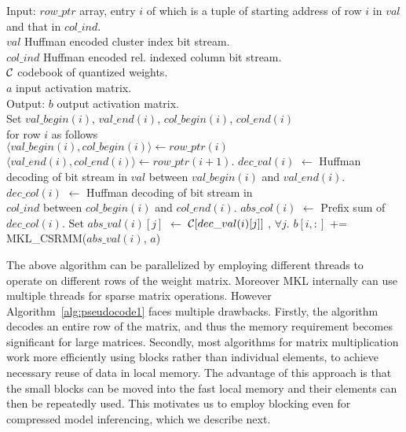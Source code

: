 \begin{algorithm}[t]
\caption{Na{\"i}ve algorithm for inferencing using compressed model }
\label{alg:pseudocode1}
\small
\begin{algorithmic}[1]
	\STATE Input: $row\_ptr$ array, entry $i$ of which is a tuple 
	of  starting address of row $i$ in $val$ and that in $col\_ind$.\\
	$val$ Huffman encoded cluster index bit stream. \\
	$col\_ind$ Huffman encoded rel. indexed column bit stream. \\
	${\cal C}$ codebook of quantized weights. \\
	$a$ input activation matrix. \\
	\STATE Output: $b$ output  activation  matrix. \\
		 
		\STATE Set $val\_begin(i)$,  $val\_end(i)$, $col\_begin(i)$, $col\_end(i)$\\
		 for row $i$ as follows \\
		 \quad  \quad $\langle val\_begin(i), col\_begin(i) \rangle \leftarrow row\_ptr(i)$\\
		 \quad  \quad $\langle val\_end(i), col\_end(i) \rangle \leftarrow row\_ptr(i+1)$.
		 \STATE $dec\_val(i)$ $\leftarrow$ Huffman decoding of bit stream in $val$ between $val\_begin(i)$ and  $val\_end(i)$.
		\STATE  $dec\_col(i)$ $\leftarrow$ Huffman decoding of bit stream in \\
		$col\_ind$ between $col\_begin(i)$ and  $col\_end(i)$.
		\STATE $abs\_col(i)$ $\leftarrow$  Prefix sum of $dec\_col(i)$.
		\STATE Set $abs\_val(i)[j]$ $\leftarrow$ ${\cal C} [dec\_val(i)[j]]$ , $\forall j$.
		\STATE $b[i, :]$ += MKL\_CSRMM($abs\_val(i)$, $a$)
	\ENDFOR	
\end{algorithmic}
\end{algorithm}

The above algorithm can be parallelized by employing different threads to operate on different rows of the weight matrix.
Moreover MKL internally can use multiple threads for sparse matrix operations.
However  Algorithm~\ref{alg:pseudocode1} faces multiple drawbacks.
Firstly, the algorithm decodes an entire row of the matrix, and thus the memory requirement becomes
significant for large matrices. 
Secondly, most  algorithms for matrix multiplication work more efficiently using  blocks rather than individual elements, to achieve necessary reuse of data in local memory.
The advantage of this approach is that the small blocks can be moved into the fast local memory and their elements can then be repeatedly used.
This motivates us to employ blocking even for compressed model inferencing, which we describe next.




